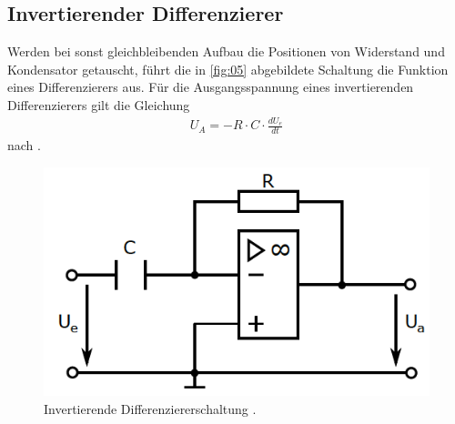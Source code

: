 \subsection{Invertierender Differenzierer}
\noindent Werden bei sonst gleichbleibenden Aufbau die Positionen von Widerstand
und Kondensator getauscht, führt die in \autoref{fig:05} abgebildete Schaltung
die Funktion eines Differenzierers aus. Für die Ausgangsspannung eines
invertierenden Differenzierers gilt die Gleichung
\begin{align}
  U_A = - R \cdot C \cdot \frac{d U_e}{dt}
  \label{eqn:08}
\end{align}
nach \cite{osnabrueck}.
\begin{figure}
  \centering
  \includegraphics[scale=0.5]{ressources/figure_05.png}
  \caption{Invertierende Differenziererschaltung \cite{sample}.}
  \label{fig:05}
\end{figure}
